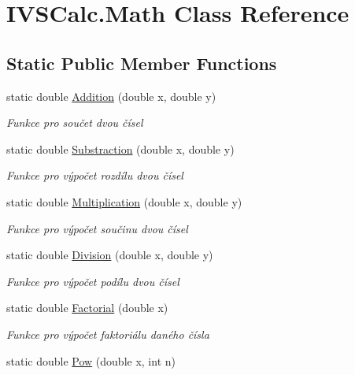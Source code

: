 \hypertarget{class_i_v_s_calc_1_1_math}{}\section{I\+V\+S\+Calc.\+Math Class Reference}
\label{class_i_v_s_calc_1_1_math}
\subsection*{Static Public Member Functions}
\begin{DoxyCompactItemize}
\item 
static double \hyperlink{class_i_v_s_calc_1_1_math_afcc47676081091c0cc9f9becfade23e5}{Addition} (double x, double y)
\begin{DoxyCompactList}\small\item\em Funkce pro součet dvou čísel \end{DoxyCompactList}\item 
static double \hyperlink{class_i_v_s_calc_1_1_math_a466689d7dfdfcb531e4788994cb08ae6}{Substraction} (double x, double y)
\begin{DoxyCompactList}\small\item\em Funkce pro výpočet rozdílu dvou čísel \end{DoxyCompactList}\item 
static double \hyperlink{class_i_v_s_calc_1_1_math_abe981553a5b5e2e2d90ce6e4cf90fde0}{Multiplication} (double x, double y)
\begin{DoxyCompactList}\small\item\em Funkce pro výpočet součinu dvou čísel \end{DoxyCompactList}\item 
static double \hyperlink{class_i_v_s_calc_1_1_math_a2cd5712706a732856fee5014ab95561a}{Division} (double x, double y)
\begin{DoxyCompactList}\small\item\em Funkce pro výpočet podílu dvou čísel \end{DoxyCompactList}\item 
static double \hyperlink{class_i_v_s_calc_1_1_math_a66e3d4331a6998b5cc1e50c292791c0d}{Factorial} (double x)
\begin{DoxyCompactList}\small\item\em Funkce pro výpočet faktoriálu daného čísla \end{DoxyCompactList}\item 
static double \hyperlink{class_i_v_s_calc_1_1_math_a8f573242101420615d09975bea8de4f0}{Pow} (double x, int n)

\end{DoxyCompactItemize}
